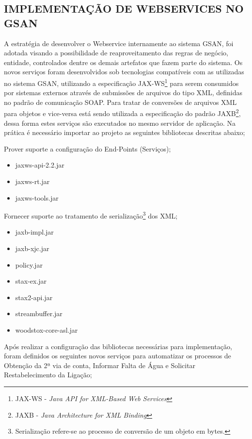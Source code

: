 \subsection{\textbf{\uppercase{Implementação de Webservices no GSAN}}}

A estratégia de desenvolver o Webservice internamente ao sistema GSAN, foi adotada visando a possibilidade de reaproveitamento das regras de negócio, entidade, controlados dentre os demais artefatos que fazem parte do sistema.  Os novos serviços foram desenvolvidos sob tecnologias compatíveis com as utilizadas no sistema GSAN, utilizando a especificação JAX-WS\footnote{JAX-WS - \textit{Java API for XML-Based Web Services}}  para serem consumidos por sistemas externos através de submissões de arquivos do tipo XML, definidas no padrão de comunicação SOAP. Para tratar de conversões de arquivos XML para objetos e vice-versa está sendo utilizada a especificação do padrão JAXB\footnote{JAXB - \textit{Java Architecture for XML Binding}}, dessa forma estes serviços são executados no mesmo servidor de aplicação.
Na prática é necessário importar ao projeto as seguintes bibliotecas descritas abaixo;

 Prover suporte a configuração do End-Points (Serviços);
	\begin{itemize}
		\item jaxws-api-2.2.jar
		\item jaxws-rt.jar
		\item jaxws-tools.jar		
	\end{itemize}
	Fornecer suporte ao tratamento de serialização\footnote{Serialização refere-se ao processo de conversão de um objeto em bytes.} dos XML;
	\begin{itemize}
		\item jaxb-impl.jar
		\item jaxb-xjc.jar
		\item policy.jar
		\item stax-ex.jar
		\item stax2-api.jar
		\item streambuffer.jar
		\item woodstox-core-asl.jar		
	\end{itemize}


Após realizar a configuração das bibliotecas necessárias para implementação, foram definidos os seguintes novos serviços para automatizar os processos de Obtenção da 2ª via de conta, Informar Falta de Água e Solicitar Restabelecimento da Ligação;

